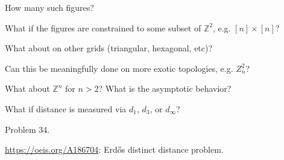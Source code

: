 \documentclass{article}
\begin{document}
\begin{related}
  \item How many such figures?
  \item What if the figures are constrained to some subset of $\mathbb Z^2$, e.g. $[n]\times[n]$?
  \item What about on other grids (triangular, hexagonal, etc)?
  \item Can this be meaningfully done on more exotic topologies, e.g. $Z_n^2$?
  \item What about $\mathbb Z^n$ for $n > 2$? What is the asymptotic behavior?
  \item What if distance is measured via $d_1$, $d_3$, or $d_\infty$?
\end{related}

\begin{references}
  \item Problem 34.
  \item \url{https://oeis.org/A186704}: Erd\H{o}s distinct distance problem.
\end{references}
\end{document}
